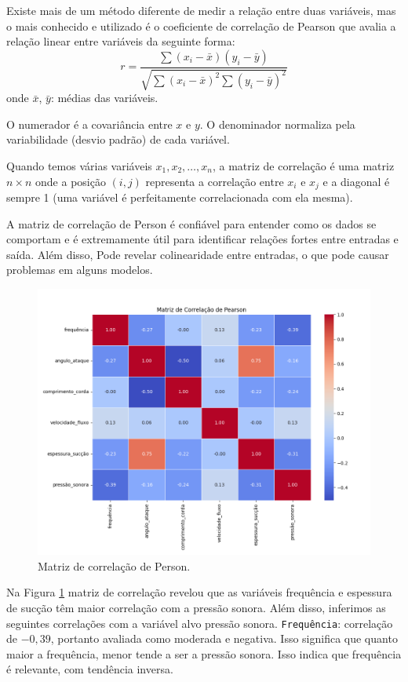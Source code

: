 \documentclass[12pt,a4paper,oneside]{report}
\begin{document}
	Existe mais de um método diferente de medir a relação entre duas variáveis, mas o mais conhecido e utilizado é o coeficiente de correlação de Pearson que avalia a rela\c{c}\~ao linear entre variáveis da seguinte forma\cite{silva:2023}:
	\begin{equation}
		r = \frac{\sum (x_i - \bar{x})(y_i - \bar{y})}{\sqrt{\sum (x_i - \bar{x})^2 \sum (y_i - \bar{y})^2}}
	\end{equation}
onde $\bar{x}$, $\bar{y}$: médias das variáveis.

O numerador é a covariância entre $x$ e $y$. O denominador normaliza pela variabilidade (desvio padrão) de cada variável.

Quando temos várias variáveis $x_1, x_2, \ldots, x_n$, a matriz de correlação é uma matriz $n \times n$ onde a posição $(i, j)$ representa a correlação entre $x_i$ e $x_j$ e a diagonal é sempre 1 (uma variável é perfeitamente correlacionada com ela mesma).

A matriz de correlação de Person é confiável para entender como os dados se comportam e é extremamente útil para identificar relações fortes entre entradas e saída. Além disso, Pode revelar colinearidade entre entradas, o que pode causar problemas em alguns modelos.
\begin{figure}[h]
	\centering
	\includegraphics[width=0.7\linewidth]{img/t1_matriz_correlacao}
	\caption{Matriz de correlação de Person.}
	\label{fig:t1matrizcorrelacao}
\end{figure}

	Na Figura \ref{fig:t1matrizcorrelacao} matriz de correla\c{c}\~ao revelou que as variáveis frequência e espessura de suc\c{c}\~ao têm maior correla\c{c}\~ao com a press\~ao sonora. Além disso, inferimos as seguintes correlações com a variável alvo pressão sonora.
	\texttt{Frequência}: correlação de $-0,39$, portanto avaliada como moderada e negativa. Isso significa que quanto maior a frequência, menor tende a ser a pressão sonora. Isso indica que frequência é relevante, com tendência inversa.
	 
\end{document}
